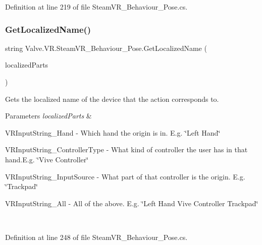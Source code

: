 Definition at line 219 of file Steam\+V\+R\+\_\+\+Behaviour\+\_\+\+Pose.\+cs.

\mbox{\label{class_valve_1_1_v_r_1_1_steam_v_r___behaviour___pose_a8ce88c34c63f922b59292680a5c0803a}} 
\subsubsection{\texorpdfstring{GetLocalizedName()}{GetLocalizedName()}}
{\footnotesize\ttfamily string Valve.\+V\+R.\+Steam\+V\+R\+\_\+\+Behaviour\+\_\+\+Pose.\+Get\+Localized\+Name (\begin{DoxyParamCaption}\item[{params \mbox{\hyperlink{namespace_valve_1_1_v_r_a05e76187bbc5846b9bfb44f6acf13912}{E\+V\+R\+Input\+String\+Bits}} \mbox{[}$\,$\mbox{]}}]{localized\+Parts }\end{DoxyParamCaption})}



Gets the localized name of the device that the action corresponds to. 


\begin{DoxyParams}{Parameters}
{\em localized\+Parts} & 
\begin{DoxyItemize}
\item V\+R\+Input\+String\+\_\+\+Hand -\/ Which hand the origin is in. E.\+g. \char`\"{}\+Left Hand\char`\"{} 
\item V\+R\+Input\+String\+\_\+\+Controller\+Type -\/ What kind of controller the user has in that hand.\+E.\+g. \char`\"{}\+Vive Controller\char`\"{} 
\item V\+R\+Input\+String\+\_\+\+Input\+Source -\/ What part of that controller is the origin. E.\+g. \char`\"{}\+Trackpad\char`\"{} 
\item V\+R\+Input\+String\+\_\+\+All -\/ All of the above. E.\+g. \char`\"{}\+Left Hand Vive Controller Trackpad\char`\"{} 
\end{DoxyItemize}\\
\hline
\end{DoxyParams}


Definition at line 248 of file Steam\+V\+R\+\_\+\+Behaviour\+\_\+\+Pose.\+cs.

\mbox{\label{class_valve_1_1_v_r_1_1_steam_v_r___behaviour___pose_a5074775b7384f0eb3754b52b4c46df17}} 
